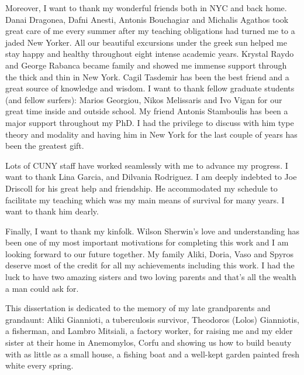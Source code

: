 Moreover, I want to thank my wonderful friends both in NYC and back home. Danai Dragonea, Dafni Anesti, Antonis Bouchagiar 
and Michalis Agathos took great care of me every summer after my teaching obligations
had turned me to a jaded New Yorker. All our beautiful excursions under the
greek sun helped me stay happy and healthy throughout eight intense academic years.
Krystal Raydo and George Rabanca became family  and showed me immense support
through the thick and thin in New York. 
Cagil Tasdemir has been the best friend and a great source of knowledge and wisdom.
I want to thank fellow graduate students (and fellow surfers): Marios Georgiou,
Nikos Melissaris and Ivo Vigan for our great time inside and outside school.
My friend Antonis Stamboulis has been a major support throughout my PhD. 
I had the privilege to discuss with him type theory and modality and having 
him in New York for the last couple of years has been 
the greatest gift. 

Lots of  CUNY staff have worked seamlessly with me to advance my progress.
I want to thank Lina Garcia, and Dilvania Rodriguez. I am deeply indebted to Joe Driscoll 
for his great help and friendship. He accommodated  my schedule to facilitate my teaching which was 
my main means of survival for many years.  I want to thank him dearly.


Finally, I want to thank my kinfolk. Wilson Sherwin's love and understanding has been one of my
most important motivations for completing this work and I am looking forward to our future together.
My family Aliki, Doria, Vaso and Spyros deserve most of the credit for all my achievements including
this work. I had the luck to have two amazing sisters and two loving parents and that's all the wealth 
a man could ask for. 

This dissertation is dedicated to the memory of my late grandparents and grandaunt: 
Aliki Giannioti, a tuberculosis survivor, Theodoros (Lolos) Gianniotis, a fisherman, and
Lambro Mitsiali, a factory  worker, for raising me and my elder sister 
at their home in Anemomylos, Corfu and showing us how to build beauty with as little as
a small house, a fishing boat and a well-kept garden painted fresh white every 
spring.